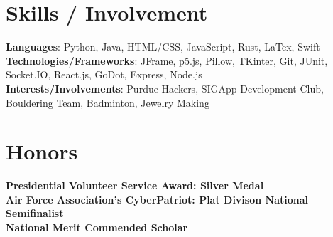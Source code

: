 \documentclass[letterpaper,11pt]{article}
\begin{document}
%
\section{Skills / Involvement}
 \begin{itemize}[leftmargin=0.15in, label={}]
    \small{\item{
     \textbf{Languages}{: Python, Java, HTML/CSS, JavaScript, Rust, LaTex, Swift} \\
     \textbf{Technologies/Frameworks}{: JFrame, p5.js, Pillow, TKinter, Git, JUnit, Socket.IO, React.js, GoDot, Express, Node.js} \\
     \textbf{Interests/Involvements}{: Purdue Hackers, SIGApp Development Club, Bouldering Team, Badminton, Jewelry Making} \\
    }}
 \end{itemize}
 \vspace{-16pt}


\section{Honors}
 \begin{itemize}[leftmargin=0.15in, label={}]
    \small{\item{
     \textbf{Presidential Volunteer Service Award: Silver Medal} \\
     \textbf{Air Force Association's CyberPatriot: Plat Divison National Semifinalist} \\
     \textbf{National Merit Commended Scholar} \\
    }}
 \end{itemize}
 \vspace{-16pt}
\end{document}

